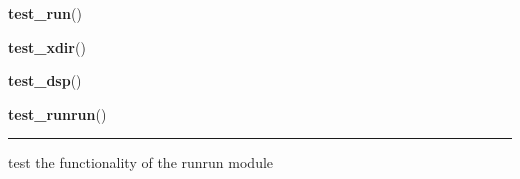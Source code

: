     \vspace{0.5ex}

    \begin{boxedminipage}{\textwidth}

    \raggedright \textbf{test\_run}()

    \end{boxedminipage}

    \label{tests:test_xdir}

    \vspace{0.5ex}

    \begin{boxedminipage}{\textwidth}

    \raggedright \textbf{test\_xdir}()

    \end{boxedminipage}

    \label{tests:test_dsp}

    \vspace{0.5ex}

    \begin{boxedminipage}{\textwidth}

    \raggedright \textbf{test\_dsp}()

    \end{boxedminipage}

    \label{tests:test_runrun}

    \vspace{0.5ex}

    \begin{boxedminipage}{\textwidth}

    \raggedright \textbf{test\_runrun}()

    \vspace{-1.5ex}

    \rule{\textwidth}{0.5\fboxrule}
    test the functionality of the runrun module

    \vspace{1ex}

    \end{boxedminipage}

    \label{tests:test_dv}

    \vspace{0.5ex}

